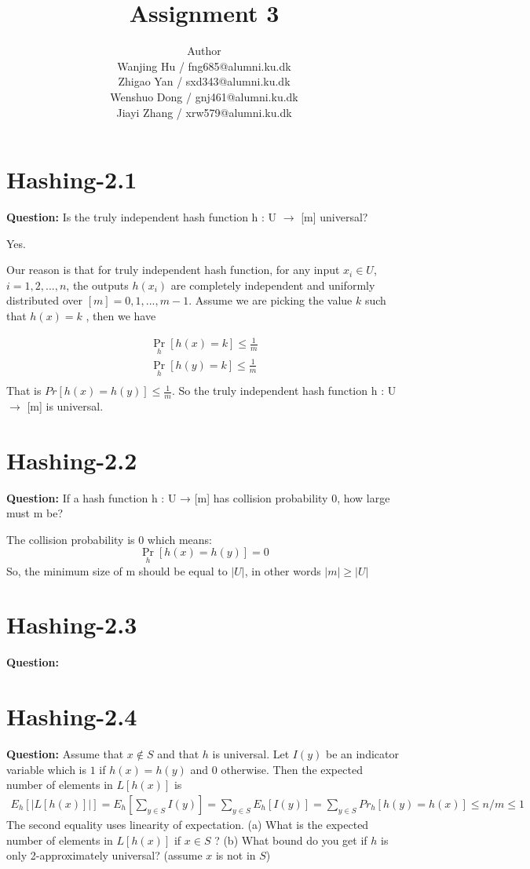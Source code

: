 \documentclass[12pt]{article}
\title{Assignment 3}
\author{Author \\
  Wanjing Hu / fng685@alumni.ku.dk  \\
  Zhigao Yan / sxd343@alumni.ku.dk  \\
  Wenshuo Dong / gnj461@alumni.ku.dk  \\
  Jiayi Zhang / xrw579@alumni.ku.dk \\
}
\begin{document}
\maketitle

\section{Hashing-2.1}
\textbf{Question: } Is the truly independent hash function h : U $\rightarrow$ [m] universal?

Yes. 

Our reason is that for truly independent hash function, for any input $x_i \in U$, $i = 1,2,...,n$, the outputs $h(x_i)$ are completely independent and uniformly distributed over $[m]={0,1,...,m-1}$. Assume we are picking the value $k$ such that $h(x)=k$ , then we have

\begin{equation}
\begin{aligned}
\mathop{Pr} \limits_{h} [h(x)=k] \leq \frac{1}{m}\\
\mathop{Pr} \limits_{h} [h(y)=k] \leq \frac{1}{m}\\
\end{aligned}
\end{equation}
That is $Pr[h(x)=h(y)] \leq \frac{1}{m}$. So the truly independent hash function h : U $\rightarrow$ [m] is universal.

\section{Hashing-2.2}
\textbf{Question:} If a hash function h : U → [m] has collision probability 0, how large must m be?

The collision probability is 0 which means:
\[\mathop{Pr} \limits_{h}[h(x)=h(y)] =0\]
So, the minimum size of m should be equal to \(|U|\), in other words \(|m|\geq|U|\)

\section{Hashing-2.3}
\textbf{Question:}

\section{Hashing-2.4}
\textbf{Question:} 
Assume that $x \notin S$ and that $h$ is universal. Let $I(y)$ be an indicator variable which is $1$ if $h(x) = h(y)$ and $0$ otherwise. Then the expected number of elements in $L[h(x)]$ is
\begin{align}
    E_h[|L[h(x)]|] = E_h [\sum_{y\in S} I(y)]  = \sum_{y \in S} E_h[I(y)] = \sum_{y \in S} Pr_h[h(y) = h(x)] \leq n/m \leq 1
\end{align}
 The second equality uses linearity of expectation.
(a) What is the expected number of elements in $L[h(x)]$ if $x \in S$ ?
(b) What bound do you get if $h$ is only 2-approximately universal? (assume $x$ is not in $S$)
\end{document}
